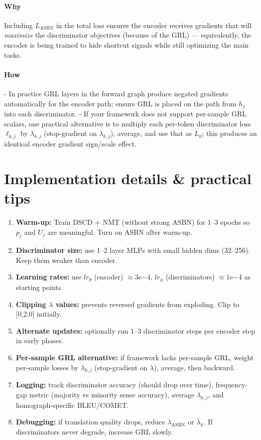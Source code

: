 \documentclass[11pt]{article}
\begin{document}
\paragraph{Why}
Including $L_{\text{ASBN}}$ in the total loss ensures the encoder receives gradients that will \emph{maximize} the discriminator objectives (because of the GRL) — equivalently, the encoder is being trained to hide shortcut signals while still optimizing the main tasks.

\paragraph{How}
- In practice GRL layers in the forward graph produce negated gradients automatically for the encoder path; ensure GRL is placed on the path from $h_j$ into each discriminator.  
- If your framework does not support per-sample GRL scalars, one practical alternative is to multiply each per-token discriminator loss $\ell_{k,j}$ by $\lambda_{k,j}$ (stop-gradient on $\lambda_{k,j}$), average, and use that as $L_k$; this produces an identical encoder gradient sign/scale effect.

\section{Implementation details \& practical tips}
\begin{enumerate}[topsep=3pt,itemsep=2pt]
  \item \textbf{Warm-up:} Train DSCD + NMT (without strong ASBN) for 1--3 epochs so $p_j$ and $U_j$ are meaningful. Turn on ASBN after warm-up.
  \item \textbf{Discriminator size:} use 1--2 layer MLPs with small hidden dims (32--256). Keep them weaker than encoder.
  \item \textbf{Learning rates:} use $lr_\theta$ (encoder) $\approx 3\mathrm{e}{-4}$, $lr_\phi$ (discriminators) $\approx 1\mathrm{e}{-4}$ as starting points.
  \item \textbf{Clipping $\lambda$ values:} prevents reversed gradients from exploding. Clip to [0,2.0] initially.
  \item \textbf{Alternate updates:} optionally run 1--3 discriminator steps per encoder step in early phases.
  \item \textbf{Per-sample GRL alternative:} if framework lacks per-sample GRL, weight per-sample losses by $\lambda_{k,j}$ (stop-gradient on $\lambda$), average, then backward.
  \item \textbf{Logging:} track discriminator accuracy (should drop over time), frequency-gap metric (majority vs minority sense accuracy), average $\lambda_{k,j}$, and homograph-specific BLEU/COMET.
  \item \textbf{Debugging:} if translation quality drops, reduce $\lambda_{\text{ASBN}}$ or $\bar{\lambda}_k$. If discriminators never degrade, increase GRL slowly.
\end{enumerate}
\end{document}
